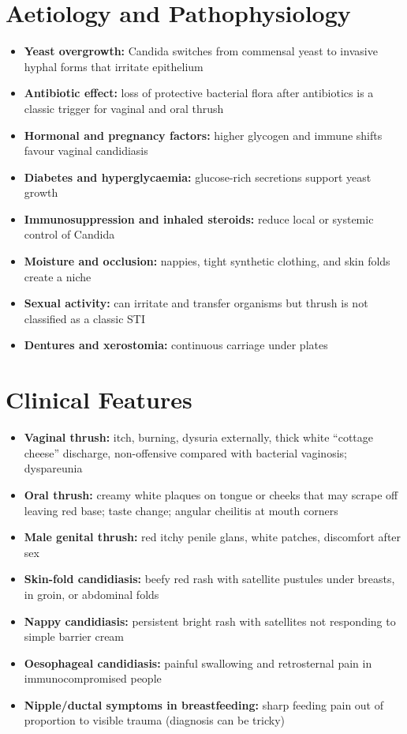 \section*{Aetiology and Pathophysiology}
\begin{itemize}
    \item \textbf{Yeast overgrowth:} Candida switches from commensal yeast to invasive hyphal forms that irritate epithelium
    \item \textbf{Antibiotic effect:} loss of protective bacterial flora after antibiotics is a classic trigger for vaginal and oral thrush
    \item \textbf{Hormonal and pregnancy factors:} higher glycogen and immune shifts favour vaginal candidiasis
    \item \textbf{Diabetes and hyperglycaemia:} glucose-rich secretions support yeast growth
    \item \textbf{Immunosuppression and inhaled steroids:} reduce local or systemic control of Candida
    \item \textbf{Moisture and occlusion:} nappies, tight synthetic clothing, and skin folds create a niche
    \item \textbf{Sexual activity:} can irritate and transfer organisms but thrush is not classified as a classic STI
    \item \textbf{Dentures and xerostomia:} continuous carriage under plates
\end{itemize}

\section*{Clinical Features}
\begin{itemize}
    \item \textbf{Vaginal thrush:} itch, burning, dysuria externally, thick white ``cottage cheese'' discharge, non-offensive compared with bacterial vaginosis; dyspareunia
    \item \textbf{Oral thrush:} creamy white plaques on tongue or cheeks that may scrape off leaving red base; taste change; angular cheilitis at mouth corners
    \item \textbf{Male genital thrush:} red itchy penile glans, white patches, discomfort after sex
    \item \textbf{Skin-fold candidiasis:} beefy red rash with satellite pustules under breasts, in groin, or abdominal folds
    \item \textbf{Nappy candidiasis:} persistent bright rash with satellites not responding to simple barrier cream
    \item \textbf{Oesophageal candidiasis:} painful swallowing and retrosternal pain in immunocompromised people
    \item \textbf{Nipple/ductal symptoms in breastfeeding:} sharp feeding pain out of proportion to visible trauma (diagnosis can be tricky)
\end{itemize}

